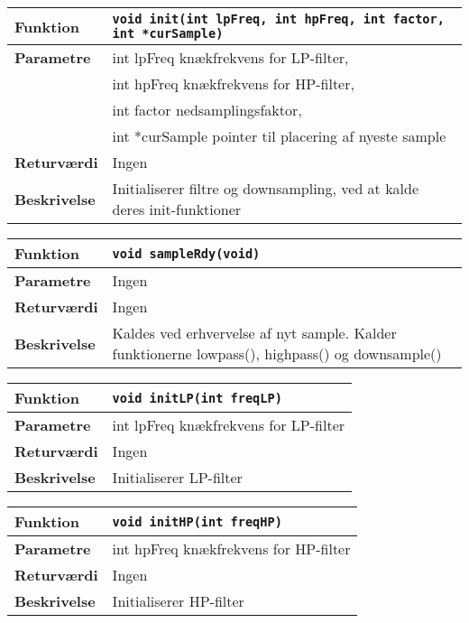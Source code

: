 \begin{center}
    \begin{tabular}{ | l | p{} |}
    \hline
    \textbf{Funktion}	& \verb+void init(int lpFreq, int hpFreq, int factor, int *curSample) +						\\ \hline
    \textbf{Parametre} 	& int lpFreq knækfrekvens for LP-filter,\\&
    						  int hpFreq knækfrekvens for HP-filter,\\&
    						  int factor nedsamplingsfaktor, \\&
    						  int *curSample pointer til placering af nyeste sample		\\ \hline
    \textbf{Returværdi}	& Ingen																				\\ \hline
    \textbf{Beskrivelse}	& Initialiserer filtre og downsampling, ved at kalde deres init-funktioner		\\ \hline
    \end{tabular}
\end{center}


\begin{center}
    \begin{tabular}{ | l | p{} |}
    \hline
    \textbf{Funktion}	& \verb+void sampleRdy(void) +						\\ \hline
    \textbf{Parametre} 	& Ingen		\\ \hline
    \textbf{Returværdi}	& Ingen 								\\ \hline
    \textbf{Beskrivelse}	& Kaldes ved erhvervelse af nyt sample. Kalder funktionerne lowpass(), highpass() og downsample()		\\ \hline
    \end{tabular}
\end{center}

\begin{center}
    \begin{tabular}{ | l | p{} |}
    \hline
    \textbf{Funktion}	& \verb+void initLP(int freqLP) +						\\ \hline
    \textbf{Parametre} 	& int lpFreq knækfrekvens for LP-filter		\\ \hline
    \textbf{Returværdi}	& Ingen 								\\ \hline
    \textbf{Beskrivelse}	& Initialiserer LP-filter		\\ \hline
    \end{tabular}
\end{center}

\begin{center}
    \begin{tabular}{ | l | p{} |}
    \hline
    \textbf{Funktion}	& \verb+void initHP(int freqHP) +						\\ \hline
    \textbf{Parametre} 	& int hpFreq knækfrekvens for HP-filter		\\ \hline
    \textbf{Returværdi}	& Ingen 								\\ \hline
    \textbf{Beskrivelse}	& Initialiserer HP-filter		\\ \hline
    \end{tabular}
\end{center}

